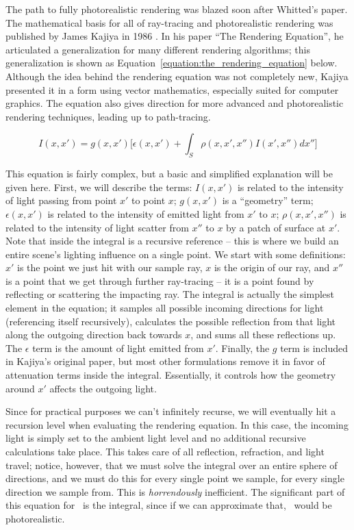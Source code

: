 The path to fully photorealistic rendering was blazed soon after Whitted's paper.
The mathematical basis for all of ray-tracing and photorealistic rendering was published by James Kajiya in 1986 \cite{kajiya1986rendering}.
In his paper ``The Rendering Equation'', he articulated a generalization for many different rendering algorithms; this generalization is shown as Equation~\ref{equation:the_rendering_equation} below.
Although the idea behind the rendering equation was not completely new, Kajiya presented it in a form using vector mathematics, especially suited for computer graphics.
The equation also gives direction for more advanced and photorealistic rendering techniques, leading up to path-tracing.

\begin{equation}
  \label{equation:the_rendering_equation}
  I(x, x') = g(x, x') \Big[\epsilon(x, x') + \int_{S} \rho(x, x',x'')I(x', x'')dx''\Big]
\end{equation}

This equation is fairly complex, but a basic and simplified explanation will be given here.
First, we will describe the terms: $I(x, x')$ is related to the intensity of light passing from point $x'$ to point $x$; $g(x, x')$ is a ``geometry'' term; $\epsilon(x, x')$ is related to the intensity of emitted light from $x'$ to $x$; $\rho(x, x',x'')$ is related to the intensity of light scatter from $x''$ to $x$ by a patch of surface at $x'$.
Note that inside the integral is a recursive reference -- this is where we build an entire scene's lighting influence on a single point.
We start with some definitions: $x'$ is the point we just hit with our sample ray, $x$ is the origin of our ray, and $x''$ is a point that we get through further ray-tracing -- it is a point found by reflecting or scattering the impacting ray.
The integral is actually the simplest element in the equation; it samples all possible incoming directions for light (referencing itself recursively), calculates the possible reflection from that light along the outgoing direction back towards $x$, and sums all these reflections up.
The $\epsilon$ term is the amount of light emitted from $x'$.
Finally, the $g$ term is included in Kajiya's original paper, but most other formulations remove it in favor of attenuation terms inside the integral.
Essentially, it controls how the geometry around $x'$ affects the outgoing light.

Since for practical purposes we can't infinitely recurse, we will eventually hit a recursion level when evaluating the rendering equation.
In this case, the incoming light is simply set to the ambient light level and no additional recursive calculations take place.
This takes care of all reflection, refraction, and light travel; notice, however, that we must solve the integral over an entire sphere of directions, and we must do this for every single point we sample, for every single direction we sample from.
This is {\it horrendously} inefficient.
The significant part of this equation for \name\ is the integral, since if we can approximate that, \name\ would be photorealistic.


